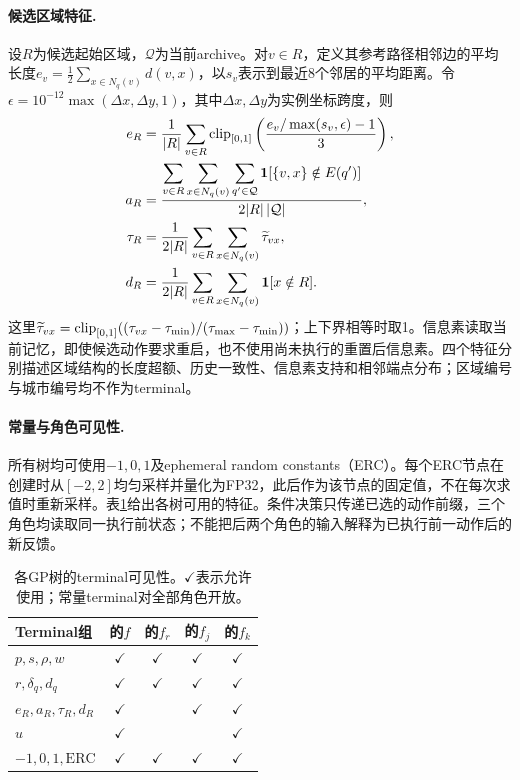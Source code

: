 \paragraph{候选区域特征.}
设$R$为候选起始区域，$\mathcal Q$为当前archive。对$v\in R$，定义其参考路径相邻边的平均长度$e_v=\frac12\sum_{x\in N_q(v)}d(v,x)$，以$s_v$表示到最近8个邻居的平均距离。令$\epsilon=10^{-12}\max(\Delta x,\Delta y,1)$，其中$\Delta x,\Delta y$为实例坐标跨度，则
\begin{align}
 e_R&=\frac1{|R|}\sum_{v\in R}\operatorname{clip}_{[0,1]}\left(\frac{e_v/\max(s_v,\epsilon)-1}{3}\right),\\
 a_R&=\frac{\displaystyle\sum_{v\in R}\sum_{x\in N_q(v)}\sum_{q'\in\mathcal Q}
       \mathbf{1}[\{v,x\}\notin E(q')]}{2|R|\,|\mathcal Q|},\\
 \tau_R&=\frac1{2|R|}\sum_{v\in R}\sum_{x\in N_q(v)}\widetilde\tau_{vx},\\
 d_R&=\frac1{2|R|}\sum_{v\in R}\sum_{x\in N_q(v)}\mathbf{1}[x\notin R].
\end{align}
这里$\widetilde\tau_{vx}=\operatorname{clip}_{[0,1]}((\tau_{vx}-\tau_{\min})/(\tau_{\max}-\tau_{\min}))$；上下界相等时取1。信息素读取当前记忆，即使候选动作要求重启，也不使用尚未执行的重置后信息素。四个特征分别描述区域结构的长度超额、历史一致性、信息素支持和相邻端点分布；区域编号与城市编号均不作为terminal。

\paragraph{常量与角色可见性.}
所有树均可使用$-1,0,1$及ephemeral random constants（ERC）。每个ERC节点在创建时从$[-2,2]$均匀采样并量化为FP32，此后作为该节点的固定值，不在每次求值时重新采样。表\ref{tab:visibility}给出各树可用的特征。条件决策只传递已选的动作前缀，三个角色均读取同一执行前状态；不能把后两个角色的输入解释为已执行前一动作后的新反馈。

\begin{table}[tb]
\caption{各GP树的terminal可见性。$\checkmark$表示允许使用；常量terminal对全部角色开放。}
\label{tab:visibility}
\centering\small
\begin{tabular}{@{}lcccc@{}}
\toprule
Terminal组 & \JS{}的$f$ & \CT{}的$f_r$ & \CT{}的$f_j$ & \CT{}的$f_k$\\ \midrule
$p,s,\rho,w$ & $\checkmark$ & $\checkmark$ & $\checkmark$ & $\checkmark$\\
$r,\delta_q,d_q$ & $\checkmark$ & $\checkmark$ & $\checkmark$ & $\checkmark$\\
$e_R,a_R,\tau_R,d_R$ & $\checkmark$ & & $\checkmark$ & $\checkmark$\\
$u$ & $\checkmark$ & & & $\checkmark$\\
$-1,0,1,\mathrm{ERC}$ & $\checkmark$ & $\checkmark$ & $\checkmark$ & $\checkmark$\\
\bottomrule
\end{tabular}
\end{table}

